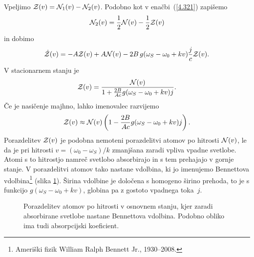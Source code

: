 Vpeljimo ${\cal Z}(v)={\cal N}_{1}(v)-{\cal N}_{2}(v)$. Podobno kot 
v enačbi~(\ref{4.321}) zapišemo
\begin{equation}
{\cal N}_{2}(v)=\frac{1}{2}{\cal N}(v)-\frac{1}{2}{\cal Z}(v)
\end{equation}
in dobimo 
\begin{equation}
\dot{{\cal Z}}(v)=-A{\cal Z}(v)+A{\cal N}(v)
-2B\,g(\omega_S-\omega_{0}+kv)\frac{j}{c}
{\cal Z}(v).
\label{4.87}
\end{equation}
V stacionarnem stanju je 
\begin{equation}
{\cal Z}(v)=\frac{{\cal N}(v)}{1+\frac{2B}{Ac}g(\omega_S-\omega_{0}+kv)j}.
\label{4.88}
\end{equation}
 Če je nasičenje majhno, lahko imenovalec razvijemo
\begin{equation}
{\cal Z}(v)\approx{\cal N}(v)\left(1-\frac{2B}{Ac}g(\omega_S-\omega_{0}+kv)j\right).
\label{4.89}
\end{equation}
Porazdelitev ${\cal Z}(v)$ je podobna nemoteni porazdelitvi atomov
po hitrosti ${\cal N}(v)$, le da je pri hitrosti $v=(\omega_{0}-\omega_S)/k$
zmanjšana zaradi vpliva vpadne svetlobe. Atomi s to hitrostjo namreč svetlobo
absorbirajo in s tem prehajajo v gornje stanje. V porazdelitvi
atomov tako nastane vdolbina, ki jo imenujemo
Bennettova vdolbina\footnote{Ameriški fizik William Ralph Bennett Jr., 1930--2008.} 
(slika \ref{fig:Bennet}). Širina vdolbine je določena
s homogeno širino prehoda, to je s funkcijo $g(\omega_S-\omega_{0}+kv)$,
globina pa z gostoto vpadnega toka~$j$.
\begin{figure}[h]
\centering
\def\svgwidth{80truemm} 

\caption{Porazdelitev atomov po hitrosti v osnovnem stanju, kjer zaradi
absorbirane svetlobe nastane Bennettova vdolbina. Podobno obliko ima 
tudi absorpcijski koeficient.}
\label{fig:Bennet}
\end{figure}


